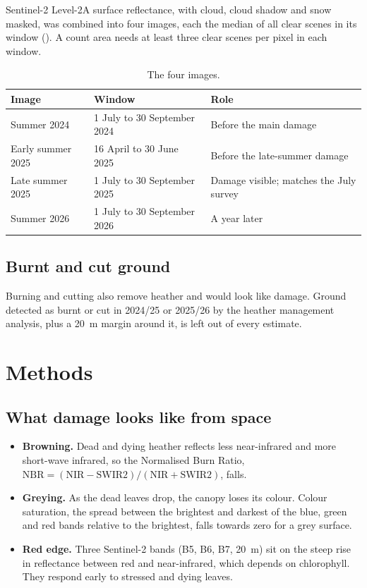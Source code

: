 \documentclass[11pt,a4paper]{article}
\begin{document}
Sentinel-2 Level-2A surface reflectance, with cloud, cloud shadow and snow masked, was combined into four images, each the median of all clear scenes in its window (). A count area needs at least three clear scenes per pixel in each window.

\begin{table}[htbp]
\centering
\caption{The four images.}\label{tab:windows}
\small
\begin{tabular}{lll}
\toprule
Image & Window & Role \\
\midrule
Summer 2024 & 1 July to 30 September 2024 & Before the main damage \\
Early summer 2025 & 16 April to 30 June 2025 & Before the late-summer damage \\
Late summer 2025 & 1 July to 30 September 2025 & Damage visible; matches the July survey \\
Summer 2026 & 1 July to 30 September 2026 & A year later \\
\bottomrule
\end{tabular}
\end{table}

\subsection{Burnt and cut ground}

Burning and cutting also remove heather and would look like damage. Ground detected as burnt or cut in 2024/25 or 2025/26 by the heather management analysis, plus a 20~m margin around it, is left out of every estimate.

\FloatBarrier
\section{Methods}\label{sec:methods}

\subsection{What damage looks like from space}

\begin{itemize}
\item \textbf{Browning.} Dead and dying heather reflects less near-infrared and more short-wave infrared, so the Normalised Burn Ratio, $\mathrm{NBR} = (\mathrm{NIR}-\mathrm{SWIR2})/(\mathrm{NIR}+\mathrm{SWIR2})$, falls.
\item \textbf{Greying.} As the dead leaves drop, the canopy loses its colour. Colour saturation, the spread between the brightest and darkest of the blue, green and red bands relative to the brightest, falls towards zero for a grey surface.
\item \textbf{Red edge.} Three Sentinel-2 bands (B5, B6, B7, 20~m) sit on the steep rise in reflectance between red and near-infrared, which depends on chlorophyll. They respond early to stressed and dying leaves.
\end{itemize}
\end{document}
